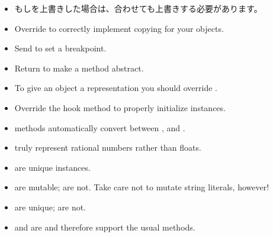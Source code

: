 \documentclass[a4paper,10pt,twoside]{book}
\begin{document}
\begin{itemize}

  \item もし\ct{=}を上書きした場合は、合わせても上書きする必要があります。

  \item Override  to correctly implement copying for your objects.

  \item Send  to set a breakpoint.

  \item Return  to make a method abstract.

  \item To give an object a  representation you should override .

  \item Override the hook method  to properly initialize instances.

  \item {} methods automatically convert between ,  and .

  \item {} truly represent rational numbers rather than floats.

  \item {} are unique instances.

  \item {} are mutable;  are not.
  Take care not to mutate string literals, however!

  \item {} are unique;  are not.

  \item {} and  are  and therefore support the usual  methods.

\end{itemize}

\ifx\wholebook\relax\else
   
   
\end{document}
